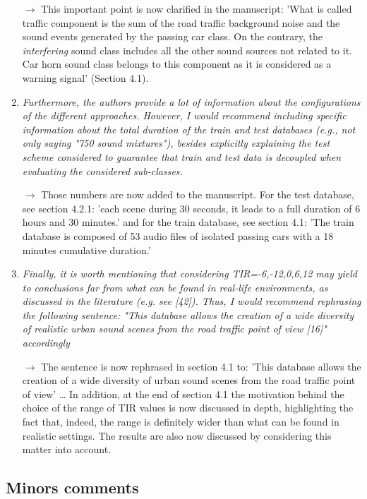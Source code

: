 \documentclass[10pt]{article}
\begin{document}
\begin{enumerate}
$\rightarrow$ This important point is now clarified in the manuscript: 'What is called traffic component is the sum of the road traffic background noise and the sound events generated by the passing car class. On the contrary, the \textit{interfering} sound class includes all the other sound sources not related to it. Car horn sound class belongs to this component as it is considered as a warning signal' (Section 4.1).


\item \emph{Furthermore, the authors provide a lot of information about the configurations of the different approaches. However, I would recommend including specific information about the total duration of the train and test databases (e.g., not only saying "750 sound mixtures"), besides explicitly explaining the test scheme considered to guarantee that train and test data is decoupled when evaluating the considered sub-classes.}

$\rightarrow$ Those numbers are now added to the manuscript. For the test database, see section 4.2.1: 'each scene during 30 seconds, it leads to a full duration of 6 hours and 30 minutes.' and for the train database, see section 4.1: 'The train database is composed of 53 audio files of isolated passing cars with a 18 minutes cumulative duration.'

\item \emph{Finally, it is worth mentioning that considering TIR={-6,-12,0,6,12} may yield to conclusions far from what can be found in real-life environments, as discussed in the literature (e.g. see [42]). Thus, I would recommend rephrasing the following sentence: "This database allows the creation of a wide diversity of realistic urban sound scenes from the road traffic point of view [16]" accordingly}

$\rightarrow$ The sentence is now rephrased in section 4.1 to: 'This database allows the creation of a wide diversity of urban sound scenes from the road traffic point of view' \dots
In addition, at the end of section 4.1 the motivation behind the choice of the range of TIR values  is now discussed in depth, highlighting the fact that, indeed, the range is definitely wider than what can be found in realistic settings. The results are also now discussed by considering this matter into account.

\end{enumerate}

\subsection{Minors comments}
\end{document}
